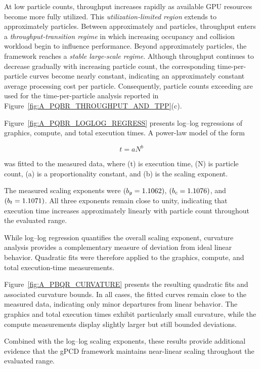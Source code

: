 

At low particle counts, throughput increases rapidly as available GPU
resources become more fully utilized. This \emph{utilization-limited region}
extends to approximately  particles. Between
approximately  and  particles,
throughput enters a \emph{throughput-transition regime} in which increasing occupancy and
collision workload begin to influence performance. Beyond
approximately  particles, the framework reaches a
\emph{stable large-scale regime}. Although throughput continues to
decrease gradually with increasing particle count, the corresponding
time-per-particle curves become nearly constant, indicating an
approximately constant average processing cost per particle.
Consequently, particle counts exceeding  are used for
the time-per-particle analysis reported in
Figure~\ref{fig:A_PQBR_THROUGHPUT_AND_TPP}(c).



Figure~\ref{fig:A_PQBR_LOGLOG_REGRESS} presents log--log regressions of
graphics, compute, and total execution times. A power-law model of the
form

\begin{equation}
t = aN^b
\end{equation}

was fitted to the measured data, where (t) is execution time, (N)
is particle count, (a) is a proportionality constant, and (b) is
the scaling exponent.

The measured scaling exponents were
$(b_g=1.1062{})$,
$(b_c=1.1076{})$, and
$(b_t=1.1071{})$.
All three exponents remain close to unity, indicating that execution
time increases approximately linearly with particle count throughout
the evaluated range.



While log--log regression quantifies the overall scaling exponent,
curvature analysis provides a complementary measure of deviation from
ideal linear behavior. Quadratic fits were therefore applied to the
graphics, compute, and total execution-time measurements.

Figure~\ref{fig:A_PBQR_CURVATURE} presents the resulting quadratic fits
and associated curvature bounds. In all cases, the fitted curves remain
close to the measured data, indicating only minor departures from
linear behavior. The graphics and total execution times exhibit
particularly small curvature, while the compute measurements display
slightly larger but still bounded deviations.

Combined with the log--log scaling exponents, these results provide
additional evidence that the gPCD framework maintains near-linear
scaling throughout the evaluated range.


